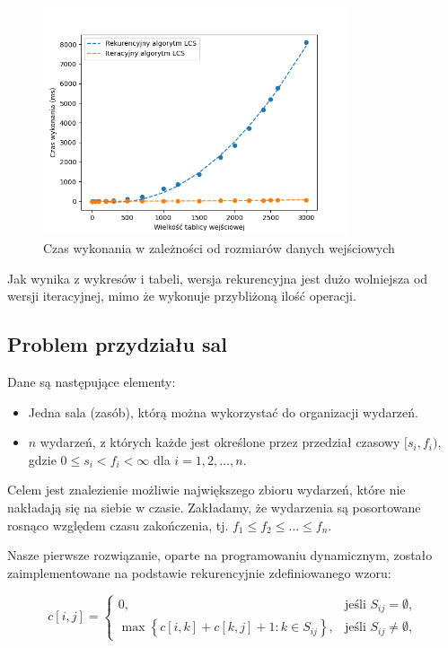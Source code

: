 \documentclass{article}
\begin{document}
\begin{figure}[H]
    \centering
    \includegraphics[width=0.8\textwidth]{Figure_6.png}
    \caption{Czas wykonania w zależności od rozmiarów danych wejściowych}
    \label{fig:lcs}
\end{figure}
Jak wynika z wykresów i tabeli, wersja rekurencyjna jest dużo wolniejsza od wersji iteracyjnej, mimo że wykonuje przybliżoną ilość operacji.
\subsection{Problem przydziału sal}
Dane są następujące elementy:
\begin{itemize}
    \item Jedna sala (zasób), którą można wykorzystać do organizacji wydarzeń.
    \item $n$ wydarzeń, z których każde jest określone przez przedział czasowy $[s_i, f_i)$, gdzie $0 \leq s_i < f_i < \infty$ dla $i = 1, 2, \dots, n$.
\end{itemize}

Celem jest znalezienie możliwie największego zbioru wydarzeń, które nie nakładają się na siebie w czasie. Zakładamy, że wydarzenia są posortowane rosnąco względem czasu zakończenia, tj. $f_1 \leq f_2 \leq \dots \leq f_n$.

Nasze pierwsze rozwiązanie, oparte na programowaniu dynamicznym, zostało zaimplementowane na podstawie rekurencyjnie zdefiniowanego wzoru:

\begin{equation}
   c[i, j] = 
   \begin{cases} 
      0, & \text{jeśli } S_{ij} = \emptyset, \\ 
      \max \left\{ c[i, k] + c[k, j] + 1 : k \in S_{ij} \right\}, & \text{jeśli } S_{ij} \neq \emptyset,
   \end{cases}
\nonumber
\end{equation}
\end{document}
